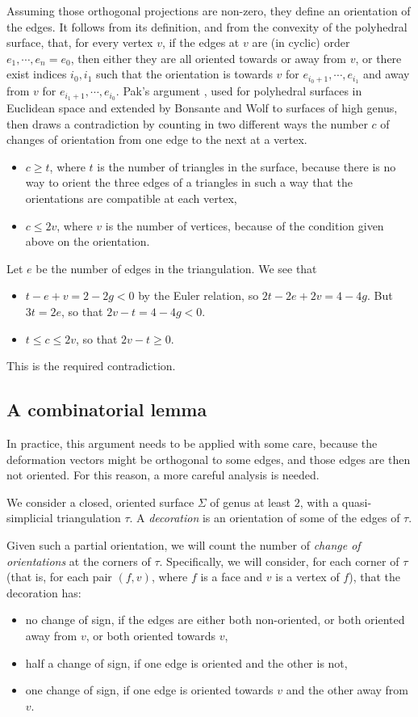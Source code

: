\documentclass[notitlepage,twoside,a4paper]{amsart}
\theoremstyle{named}
\begin{document}
Assuming those orthogonal projections are non-zero, they define an orientation of the edges. It follows from its definition, and from the convexity of the polyhedral surface, that, for every vertex $v$, if the edges at $v$ are (in cyclic) order $e_1, \cdots, e_n=e_0$, then either they are all oriented towards or away from $v$, or there exist indices $i_0, i_1$ such that the orientation is towards $v$ for $e_{i_0+1}, \cdots, e_{i_1}$ and away from $v$ for $e_{i_1+1}, \cdots, e_{i_0}$. Pak's  argument \cite{pak:short}, used for polyhedral surfaces in Euclidean space and extended by Bonsante and Wolf \cite{bonsante-wolf:projective} to surfaces of high genus, then draws a contradiction by counting in two different ways the number $c$ of changes of orientation from one edge to the next at a vertex.
\begin{itemize}
\item $c\geq t$, where $t$ is the number of triangles in the surface, because there is no way to orient the three edges of a triangles in such a way that the orientations are compatible at each vertex,
\item $c\leq 2v$, where $v$ is the number of vertices, because of the condition given above on the orientation. 
\end{itemize}
Let $e$ be the number of edges in the triangulation. We see that
\begin{itemize}
\item $t-e+v=2-2g<0$ by the Euler relation, so $2t-2e+2v=4-4g$. But $3t=2e$, so that $2v-t=4-4g<0$.
\item $t\leq c\leq 2v$, so that $2v-t\geq 0$.
\end{itemize}
This is the required contradiction.

\subsection{A combinatorial lemma}

In practice, this argument needs to be applied with some care, because the deformation vectors might be orthogonal to some edges, and those edges are then not oriented. For this reason, a more careful analysis is needed.

We consider a closed, oriented surface $\Sigma$ of genus at least $2$, with a quasi-simplicial triangulation $\tau$. A {\em decoration} is an orientation of some of the edges  of $\tau$. 

Given such a partial orientation, we will count the number of {\em change of orientations} at the corners of $\tau$. Specifically, we will consider, for each corner of $\tau$ (that is, for each pair $(f,v)$, where $f$ is a face and $v$ is a vertex of $f$), that the decoration has:
\begin{itemize}
\item no change of sign, if the edges are either both non-oriented, or both oriented away from $v$, or both oriented towards $v$,
\item half a change of sign, if one edge is oriented and the other is not,
\item one change of sign, if one edge is oriented towards $v$ and the other away from $v$.
\end{itemize}
\end{document}
